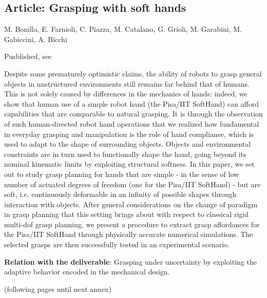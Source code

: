 \documentclass[a4paper,11pt,pdf]{pacmanreport}
\begin{document}
\subsection{Article: Grasping with soft hands} \label{ann:softGrasps}
\begin{description}
    \item[Authors] M. Bonilla, E. Farnioli, C. Piazza, M. Catalano, G. Grioli, M. Garabini, M. Gabiccini, A. Bicchi
    \item[Info] Pusblished, see~\cite{Bonilla:Humanoids:2015} 
    \item[Abstract] Despite some prematurely optimistic claims, the ability of robots to grasp general objects in unstructured environments still remains far behind that of humans. This is not solely caused by differences in the mechanics of hands: indeed, we show that human use of a simple robot hand (the Pisa/IIT SoftHand) can afford capabilities that are comparable to natural grasping. It is through the observation of such human-directed robot hand operations that we realized how fundamental in everyday grasping and manipulation is the role of hand compliance, which is used to adapt to the shape of surrounding objects. Objects and environmental constraints are in turn used to functionally shape the hand, going beyond its nominal kinematic limits by exploiting structural softness. In this paper, we set out to study grasp planning for hands that are simple - in the sense of low number of actuated degrees of freedom (one for the Pisa/IIT SoftHand) - but are soft, i.e. continuously deformable in an infinity of possible shapes through interaction with objects. After general considerations on the change of paradigm in grasp planning that this setting brings about with respect to classical rigid multi-dof grasp planning, we present a procedure to extract grasp affordances for the Pisa/IIT SoftHand through physically accurate numerical simulations. The selected grasps are then successfully tested in an experimental scenario.
    \item \textbf{Relation with the deliverable}: Grasping under uncertainty by exploiting the adaptive behavior encoded in the mechanical design.
    \item[Attachment] (following pages until next annex)
\end{description}

\end{document}

